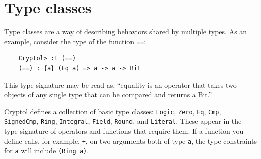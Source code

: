 \section{Type classes}\indTypeClasses
\label{sec:type-classes}



Type classes are a way of describing behaviors shared by multiple
types.  As an example, consider the type of the function {\tt ==}:
\begin{Verbatim}
    Cryptol> :t (==)
    (==) : {a} (Eq a) => a -> a -> Bit
\end{Verbatim}

This type signature may be read as, ``equality is an operator that
takes two objects of any single type that can be compared and returns
a Bit.''

Cryptol defines a collection of basic type classes: \texttt{Logic},
\texttt{Zero}, \texttt{Eq}, \texttt{Cmp}, \texttt{SignedCmp}, \texttt{Ring},
\texttt{Integral}, \texttt{Field}, \texttt{Round}, and
\texttt{Literal}. These appear in the type signature of operators and
functions that require them. If a function you define calls, for
example, \texttt{+}, on two arguments both of type \texttt{a}, the
type constraints for \texttt{a} will include \texttt{(Ring a)}.


